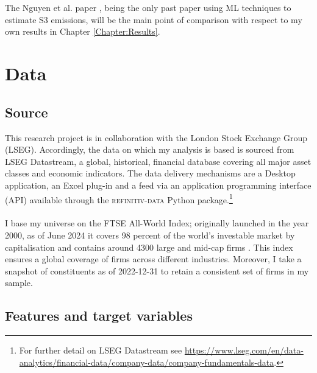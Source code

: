 \documentclass[12pt,twoside]{report}
\begin{document}
\\\\
The Nguyen et al. paper \cite{Nguyenetal2023}, being the only past paper using ML techniques to estimate S3 emissions, will be the main point of comparison with respect to my own results in Chapter \ref{Chapter:Results}.

\chapter{Data}\label{Chapter:Data}

\section{Source}
This research project is in collaboration with the London Stock Exchange Group (LSEG). Accordingly, the data on which my analysis is based is sourced from LSEG Datastream, a global, historical, financial database covering all major asset classes and economic indicators. The data delivery mechanisms are a Desktop application, an Excel plug-in and a feed via an application programming interface (API) available through the \textsc{refinitiv-data} Python package.\footnote{For further detail on LSEG Datastream see \href{https://www.lseg.com/en/data-analytics/financial-data/company-data/company-fundamentals-data}{https://www.lseg.com/en/data-analytics/financial-data/company-data/company-fundamentals-data}.}
\\\\
I base my universe on the FTSE All-World Index; originally launched in the year 2000, as of June 2024 it covers 98 percent of the world's investable market by capitalisation and contains around 4300 large and mid-cap firms \cite{FTSERussell2024b}. This index ensures a global coverage of firms across different industries. Moreover, I take a snapshot of constituents as of 2022-12-31 to retain a consistent set of firms in my sample. 

\section{Features and target variables}\label{sec:FeaturesAndTargetVariables}
\end{document}

